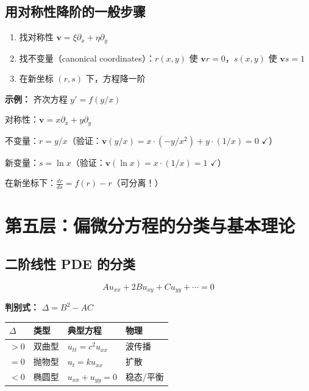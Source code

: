 \subsection{用对称性降阶的一般步骤}

\begin{enumerate}
  \item 找对称性 $\mathbf{v} = \xi\partial_x + \eta\partial_y$
  \item 找不变量（canonical coordinates）：$r(x,y)$ 使 $\mathbf{v}r = 0$，$s(x,y)$ 使 $\mathbf{v}s = 1$
  \item 在新坐标 $(r, s)$ 下，方程降一阶
\end{enumerate}

\textbf{示例：} 齐次方程 $y' = f(y/x)$

对称性：$\mathbf{v} = x\partial_x + y\partial_y$

不变量：$r = y/x$（验证：$\mathbf{v}(y/x) = x \cdot (-y/x^2) + y \cdot (1/x) = 0$ $\checkmark$）

新变量：$s = \ln x$（验证：$\mathbf{v}(\ln x) = x \cdot (1/x) = 1$ $\checkmark$）

在新坐标下：$\frac{dr}{ds} = f(r) - r$（可分离！）

\section{第五层：偏微分方程的分类与基本理论}

\subsection{二阶线性 PDE 的分类}

\[
Au_{xx} + 2Bu_{xy} + Cu_{yy} + \cdots = 0
\]

\textbf{判别式：} $\Delta = B^2 - AC$

\begin{center}
\begin{tabular}{L{2cm}L{2.5cm}L{4cm}L{3cm}}
\toprule
\textbf{$\Delta$} & \textbf{类型} & \textbf{典型方程} & \textbf{物理} \\
\midrule
$> 0$ & 双曲型 & $u_{tt} = c^2 u_{xx}$ & 波传播 \\
$= 0$ & 抛物型 & $u_t = ku_{xx}$ & 扩散 \\
$< 0$ & 椭圆型 & $u_{xx} + u_{yy} = 0$ & 稳态/平衡 \\
\bottomrule
\end{tabular}
\end{center}

